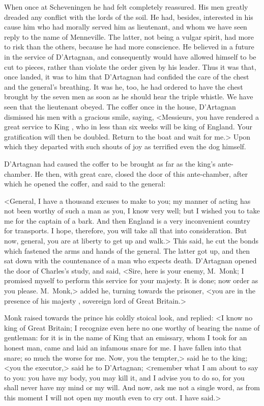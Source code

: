When once at Scheveningen he had felt completely reassured. His men greatly dreaded any conflict with the lords of the soil. He had, besides, interested in his cause him who had morally served him as lieutenant, and whom we have seen reply to the name of Menneville. The latter, not being a vulgar spirit, had more to risk than the others, because he had more conscience. He believed in a future in the service of D'Artagnan, and consequently would have allowed himself to be cut to pieces, rather than violate the order given by his leader. Thus it was that, once landed, it was to him that D'Artagnan had confided the care of the chest and the general's breathing. It was he, too, he had ordered to have the chest brought by the seven men as soon as he should hear the triple whistle. We have seen that the lieutenant obeyed. The coffer once in the house, D'Artagnan dismissed his men with a gracious smile, saying, <Messieurs, you have rendered a great service to King , who in less than six weeks will be king of England. Your gratification will then be doubled. Return to the boat and wait for me.> Upon which they departed with such shouts of joy as terrified even the dog himself.

D'Artagnan had caused the coffer to be brought as far as the king's ante-chamber. He then, with great care, closed the door of this ante-chamber, after which he opened the coffer, and said to the general:

<General, I have a thousand excuses to make to you; my manner of acting has not been worthy of such a man as you, I know very well; but I wished you to take me for the captain of a bark. And then England is a very inconvenient country for transports. I hope, therefore, you will take all that into consideration. But now, general, you are at liberty to get up and walk.> This said, he cut the bonds which fastened the arms and hands of the general. The latter got up, and then sat down with the countenance of a man who expects death. D'Artagnan opened the door of Charles's study, and said, <Sire, here is your enemy, M.~Monk; I promised myself to perform this service for your majesty. It is done; now order as you please. M.~Monk,> added he, turning towards the prisoner, <you are in the presence of his majesty , sovereign lord of Great Britain.>

Monk raised towards the prince his coldly stoical look, and replied: <I know no king of Great Britain; I recognize even here no one worthy of bearing the name of gentleman: for it is in the name of King  that an emissary, whom I took for an honest man, came and laid an infamous snare for me. I have fallen into that snare; so much the worse for me. Now, you the tempter,> said he to the king; <you the executor,> said he to D'Artagnan; <remember what I am about to say to you: you have my body, you may kill it, and I advise you to do so, for you shall never have my mind or my will. And now, ask me not a single word, as from this moment I will not open my mouth even to cry out. I have said.>

